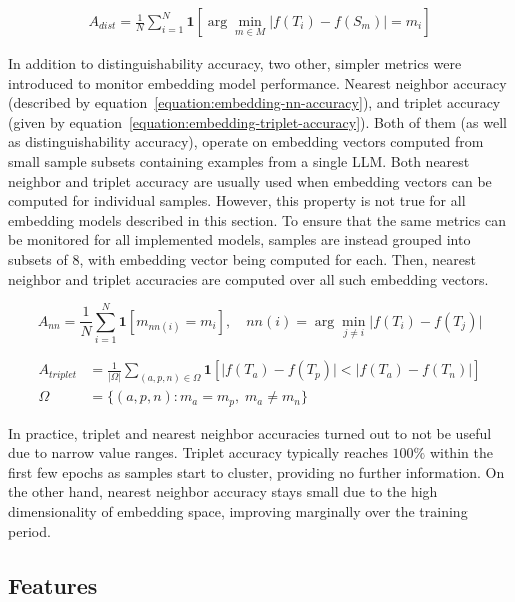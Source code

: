 \documentclass[a4paper,11pt,twoside]{report}
\theoremstyle{definition}
\begin{document}
\begin{align}
\label{equation:embedding-dist-accuracy}
    A_{dist} = \frac{1}{N} \sum_{i=1}^{N} \mathbf{1}\!\left[\arg\min_{m \in M} \vert f(T_i) - f(S_m) \vert = m_i\right]
\end{align}

In addition to distinguishability accuracy, two other, simpler metrics were introduced to monitor embedding model performance. Nearest neighbor accuracy (described by equation~\ref{equation:embedding-nn-accuracy}), and triplet accuracy (given by equation~\ref{equation:embedding-triplet-accuracy}). Both of them (as well as distinguishability accuracy), operate on embedding vectors computed from small sample subsets containing examples from a single LLM. Both nearest neighbor and triplet accuracy are usually used when embedding vectors can be computed for individual samples. However, this property is not true for all embedding models described in this section. To ensure that the same metrics can be monitored for all implemented models, samples are instead grouped into subsets of 8, with embedding vector being computed for each. Then, nearest neighbor and triplet accuracies are computed over all such embedding vectors. 

\begin{equation}
\label{equation:embedding-nn-accuracy}
    A_{nn} = \frac{1}{N} \sum_{i=1}^{N} \mathbf{1}\!\left[m_{nn(i)} = m_i\right], \quad nn(i) = \arg\min_{j \neq i} \vert f(T_i) - f(T_j) \vert
\end{equation}

\begin{align}
\label{equation:embedding-triplet-accuracy}
    A_{triplet} &= \frac{1}{|\Omega|} \sum_{(a,p,n) \in \Omega} \mathbf{1}\!\left[\vert f(T_a) - f(T_p) \vert < \vert f(T_a) - f(T_n) \vert\right] \\
    \Omega &= \{(a, p, n) : m_a = m_p,\; m_a \neq m_n\}
\end{align}

In practice, triplet and nearest neighbor accuracies turned out to not be useful due to narrow value ranges. Triplet accuracy typically reaches $100 \%$ within the first few epochs as samples start to cluster, providing no further information. On the other hand, nearest neighbor accuracy stays small due to the high dimensionality of embedding space, improving marginally over the training period. 

\subsection{Features}
\label{section:llm-embedding-features}
\end{document}

